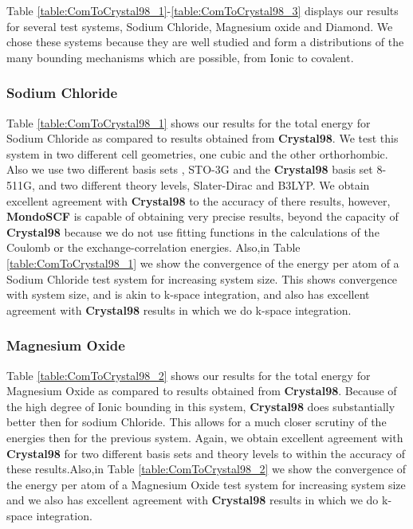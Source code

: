\commentoutA{\documentclass[prb,aps,twocolumn,showpacs,twocolumngrid,superbib]{revtex4}}
\begin{document}
Table \ref{table:ComToCrystal98_1}-\ref{table:ComToCrystal98_3}
displays our results for several test systems, Sodium Chloride, Magnesium
oxide and Diamond. We chose these systems because they are well studied
and form a distributions of the many bounding mechanisms which are
possible, from Ionic to covalent.


\subsubsection{Sodium Chloride}

Table \ref{table:ComToCrystal98_1} shows our results for the total
energy for Sodium Chloride as compared to results obtained from \textbf{Crystal98}.
We test this system in two different cell geometries, one cubic and
the other orthorhombic. Also we use two different basis sets , STO-3G
and the \textbf{Crystal98} basis set 8-511G, and two different theory levels, 
Slater-Dirac and B3LYP. We obtain excellent agreement with \textbf{Crystal98} to the accuracy
of there results, however, \textbf{MondoSCF} is capable of obtaining
very precise results, beyond the capacity of \textbf{Crystal98} because
we do not use fitting functions in the calculations of the Coulomb
or the exchange-correlation energies. Also,in Table \ref{table:ComToCrystal98_1}
we show the convergence of the energy per atom of a Sodium Chloride
test system for increasing system size. This shows convergence with
system size, and is akin to k-space integration, and also has excellent agreement
with \textbf{Crystal98} results in which we do k-space integration. 


\subsubsection{Magnesium Oxide}

Table \ref{table:ComToCrystal98_2} shows our results for the total
energy for Magnesium Oxide as compared to results obtained from \textbf{Crystal98}.
Because of the high degree of Ionic bounding in this system, \textbf{Crystal98}
does substantially better then for sodium Chloride. This allows for
a much closer scrutiny of the energies then for the previous system.
Again, we obtain excellent agreement with \textbf{Crystal98} for two
different basis sets and theory levels to within the accuracy of these
results.Also,in Table \ref{table:ComToCrystal98_2}
we show the convergence of the energy per atom of a Magnesium Oxide
test system for increasing system size and we also has excellent agreement
with \textbf{Crystal98} results in which we do k-space integration.
\end{document}
